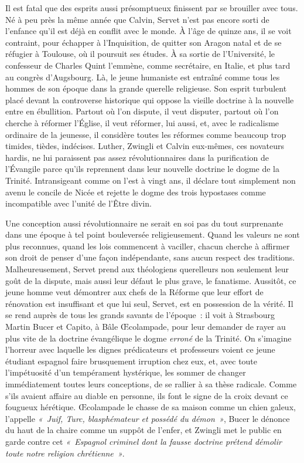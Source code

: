 \documentclass[french,twoside]{book} %
\begin{document}
Il est fatal que des esprits aussi présomptueux finissent par se brouiller avec tous. Né à peu près la même année que Calvin, Servet n’est pas encore sorti de l’enfance qu’il est déjà en conflit avec le monde. À l’âge de quinze ans, il se voit contraint, pour échapper à l’Inquisition, de quitter son Aragon natal et de se réfugier à Toulouse, où il poursuit ses études. À sa sortie de l’Université, le confesseur de Charles Quint l’emmène, comme secrétaire, en Italie, et plus tard au congrès d’Augsbourg. Là, le jeune humaniste est entraîné comme tous les hommes de son époque dans la grande querelle religieuse. Son esprit turbulent placé devant la controverse historique qui oppose la vieille doctrine à la nouvelle entre en ébullition. Partout où l’on dispute, il veut disputer, partout où l’on cherche à réformer l’Église, il veut réformer, lui aussi, et, avec le radicalisme ordinaire de la jeunesse, il considère toutes les réformes comme beaucoup trop timides, tièdes, indécises. Luther, Zwingli et Calvin eux-mêmes, ces novateurs hardis, ne lui paraissent pas assez révolutionnaires dans la purification de l’Évangile parce qu’ils reprennent dans leur nouvelle doctrine le dogme de la Trinité. Intransigeant comme on l’est à vingt ans, il déclare tout simplement non avenu le concile de Nicée et rejette le dogme des trois hypostases comme incompatible avec l’unité de l’Être divin.\par
Une conception aussi révolutionnaire ne serait en soi pas du tout surprenante dans une époque à tel point bouleversée religieusement. Quand les valeurs ne sont plus reconnues, quand les lois commencent à vaciller, chacun cherche à affirmer son droit de penser d’une façon indépendante, sans aucun respect des traditions. Malheureusement, Servet prend aux théologiens querelleurs non seulement leur goût de la dispute, mais aussi leur défaut le plus grave, le fanatisme. Aussitôt, ce jeune homme veut démontrer aux chefs de la Réforme que leur effort de rénovation est insuffisant et que lui seul, Servet, est en possession de la vérité. Il se rend auprès de tous les grands savants de l’époque : il voit à Strasbourg Martin Bucer et Capito, à Bâle Œcolampade, pour leur demander de rayer au plus vite de la doctrine évangélique le dogme \emph{erroné} de la Trinité. On s’imagine l’horreur avec laquelle les dignes prédicateurs et professeurs voient ce jeune étudiant espagnol faire brusquement irruption chez eux, et, avec toute l’impétuosité d’un tempérament hystérique, les sommer de changer immédiatement toutes leurs conceptions, de se rallier à sa thèse radicale. Comme s’ils avaient affaire au diable en personne, ils font le signe de la croix devant ce fougueux hérétique. Œcolampade le chasse de sa maison comme un chien galeux, l’appelle \emph{« Juif, Turc, blasphémateur et possédé du démon »}, Bucer le dénonce du haut de la chaire comme un suppôt de l’enfer, et Zwingli met le public en garde contre cet \emph{« Espagnol criminel dont la fausse doctrine prétend démolir toute notre religion chrétienne »}.\par
\end{document}
